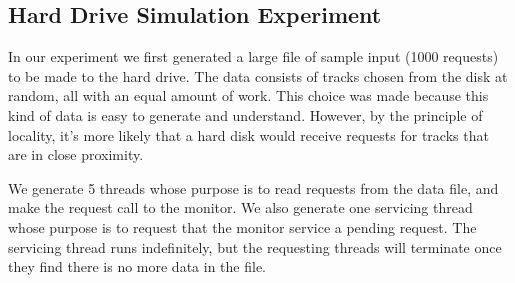 \documentclass{report}
\begin{document}
\subsection{Hard Drive Simulation Experiment}
In our experiment we first generated a large file of sample input (1000 requests) to be made to
the hard drive. The data consists of tracks chosen from the disk at random, all with an
equal amount of work. This choice was made because this kind of data is easy to generate
and understand. However, by the principle of locality, it's more likely that a
hard disk would receive requests for tracks that are in close proximity.

We generate 5 threads whose purpose is to read requests from the data file, and make the
request call to the monitor. We also generate one servicing thread whose purpose is to
request that the monitor service a pending request. The servicing thread runs
indefinitely, but the requesting threads will terminate once they find there is no more
data in the file.
\end{document}
